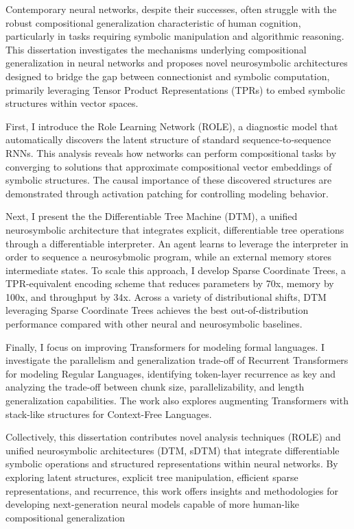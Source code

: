 Contemporary neural networks, despite their successes, often struggle with the robust compositional generalization characteristic of human cognition, particularly in tasks requiring symbolic manipulation and algorithmic reasoning. This dissertation investigates the mechanisms underlying compositional generalization in neural networks and proposes novel neurosymbolic architectures designed to bridge the gap between connectionist and symbolic computation, primarily leveraging Tensor Product Representations (TPRs) to embed symbolic structures within vector spaces.

First, I introduce the Role Learning Network (ROLE), a diagnostic model that automatically discovers the latent structure of standard sequence‑to‑sequence RNNs. This analysis reveals how networks can perform compositional tasks by converging to solutions that approximate compositional vector embeddings of symbolic structures. The causal importance of these discovered structures are demonstrated through activation patching for controlling modeling behavior.

Next, I present the the Differentiable Tree Machine (DTM), a unified neurosymbolic architecture that integrates explicit, differentiable tree operations through a differentiable interpreter. An agent learns to leverage the interpreter in order to sequence a neurosybmolic program, while an external memory stores intermediate states. To scale this approach, I develop Sparse Coordinate Trees, a TPR-equivalent encoding scheme that reduces parameters by 70x, memory by 100x, and throughput by 34x. Across a variety of distributional shifts, DTM leveraging Sparse Coordinate Trees achieves the best out-of-distribution performance compared with other neural and neurosymbolic baselines.

Finally, I focus on improving Transformers for modeling formal languages. I investigate the parallelism and generalization trade-off of Recurrent Transformers for modeling Regular Languages, identifying token-layer recurrence as key and analyzing the trade-off between chunk size, parallelizability, and length generalization capabilities. The work also explores augmenting Transformers with stack-like structures for Context-Free Languages.

Collectively, this dissertation contributes novel analysis techniques (ROLE) and unified neurosymbolic architectures (DTM, sDTM) that integrate differentiable symbolic operations and structured representations within neural networks. By exploring latent structures, explicit tree manipulation, efficient sparse representations, and recurrence, this work offers insights and methodologies for developing next-generation neural models capable of more human-like compositional generalization

